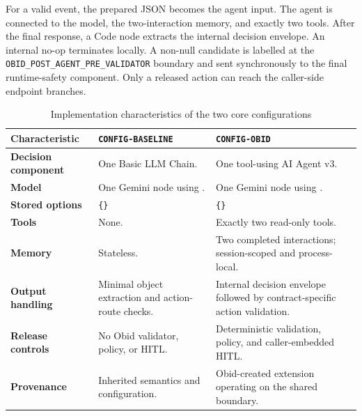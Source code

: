 For a valid event, the prepared JSON becomes the agent input. The agent is
connected to the model, the two-interaction memory, and exactly two tools.
After the final response, a Code node extracts the internal decision envelope.
An internal no-op terminates locally. A non-null candidate is labelled at the
\texttt{OBID\_POST\_AGENT\_PRE\_VALIDATOR} boundary and sent synchronously to
the final runtime-safety component. Only a released action can reach the
caller-side endpoint branches.

\begin{table}[H]
\centering
\caption{Implementation characteristics of the two core configurations}
\label{tab:impl-configurations}

\begingroup
\small
\setlength{\tabcolsep}{4pt}
\renewcommand{\arraystretch}{1.14}

\begin{tabularx}{\textwidth}{
  @{}
  L{0.23\textwidth}
  Y
  Y
  @{}
}
\toprule
\textbf{Characteristic}
&
\textbf{\texttt{CONFIG-BASELINE}}
&
\textbf{\texttt{CONFIG-OBID}}
\\
\midrule

\textbf{Decision component}
&
One Basic LLM Chain.
&
One tool-using AI Agent v3.
\\
\addlinespace[1.5pt]

\textbf{Model}
&
One Gemini node using
.
&
One Gemini node using
.
\\
\addlinespace[1.5pt]

\textbf{Stored options}
&
\texttt{\{\}}
&
\texttt{\{\}}
\\
\addlinespace[1.5pt]

\textbf{Tools}
&
None.
&
Exactly two read-only tools.
\\
\addlinespace[1.5pt]

\textbf{Memory}
&
Stateless.
&
Two completed interactions; session-scoped and process-local.
\\
\addlinespace[1.5pt]

\textbf{Output handling}
&
Minimal object extraction and action-route checks.
&
Internal decision envelope followed by contract-specific action
validation.
\\
\addlinespace[1.5pt]

\textbf{Release controls}
&
No Obid validator, policy, or HITL.
&
Deterministic validation, policy, and caller-embedded HITL.
\\
\addlinespace[1.5pt]

\textbf{Provenance}
&
Inherited semantics and configuration.
&
Obid-created extension operating on the shared boundary.
\\

\bottomrule
\end{tabularx}
\endgroup
\end{table}


